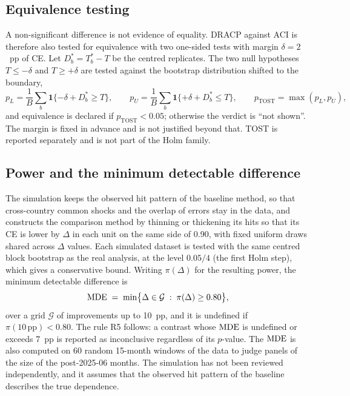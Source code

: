 \subsection{Equivalence testing}\label{sec:tost}

A non-significant difference is not evidence of equality. DRACP against ACI is therefore also tested for equivalence with two one-sided tests \citep[TOST;][]{schuirmann1987tost} with margin $\delta=2$~pp of CE. Let $D^{*}_b=T^{*}_b-T$ be the centred replicates. The two null hypotheses $T\le-\delta$ and $T\ge+\delta$ are tested against the bootstrap distribution shifted to the boundary,
\begin{equation}\label{eq:tost}
p_L=\frac1B\sum_{b}\mathbf 1\{-\delta+D^{*}_b\ge T\},\qquad
p_U=\frac1B\sum_{b}\mathbf 1\{+\delta+D^{*}_b\le T\},\qquad
p_{\mathrm{TOST}}=\max(p_L,p_U),
\end{equation}
and equivalence is declared if $p_{\mathrm{TOST}}<0.05$; otherwise the verdict is ``not shown''. The margin is fixed in advance and is not justified beyond that. TOST is reported separately and is not part of the Holm family.

\subsection{Power and the minimum detectable difference}\label{sec:mde}

The simulation keeps the observed hit pattern of the baseline method, so that cross-country common shocks and the overlap of errors stay in the data, and constructs the comparison method by thinning or thickening its hits so that its CE is lower by $\Delta$ in each unit on the same side of 0.90, with fixed uniform draws shared across $\Delta$ values. Each simulated dataset is tested with the same centred block bootstrap as the real analysis, at the level $0.05/4$ (the first Holm step), which gives a conservative bound. Writing $\pi(\Delta)$ for the resulting power, the minimum detectable difference is
\begin{equation}\label{eq:mde}
\mathrm{MDE} \;=\; \min\bigl\{\Delta\in\mathcal G \;:\; \pi(\Delta)\ge 0.80\bigr\},
\end{equation}
over a grid $\mathcal G$ of improvements up to 10~pp, and it is undefined if $\pi(10\,\mathrm{pp})<0.80$. The rule R5 follows: a contrast whose $\mathrm{MDE}$ is undefined or exceeds 7~pp is reported as inconclusive regardless of its $p$-value. The $\mathrm{MDE}$ is also computed on 60 random 15-month windows of the data to judge panels of the size of the post-2025-06 months. The simulation has not been reviewed independently, and it assumes that the observed hit pattern of the baseline describes the true dependence.

